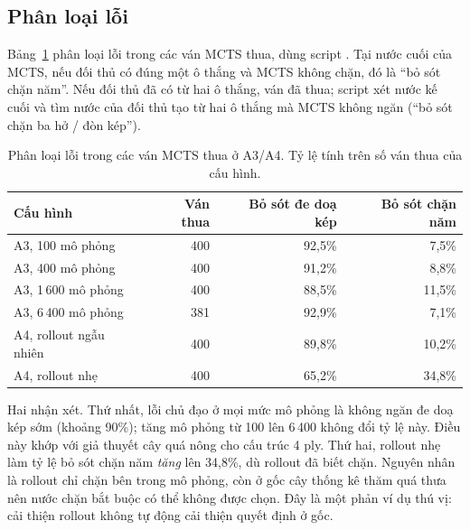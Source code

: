 \subsection{Phân loại lỗi}
Bảng~\ref{tab:tn-loi-mcts} phân loại lỗi trong các ván MCTS thua, dùng script
. Tại nước cuối của MCTS, nếu đối thủ có đúng
một ô thắng và MCTS không chặn, đó là ``bỏ sót chặn năm''. Nếu đối thủ đã có từ hai ô thắng,
ván đã thua; script xét nước kế cuối và tìm nước của đối thủ tạo từ hai ô thắng mà MCTS không
ngăn (``bỏ sót chặn ba hở / đòn kép'').

\begin{table}[H]
  \centering\small
  \caption{Phân loại lỗi trong các ván MCTS thua ở A3/A4. Tỷ lệ tính trên số ván thua của cấu
  hình.}
  \label{tab:tn-loi-mcts}
  \begin{tabular}{@{}lrrr@{}}
    \toprule
    \textbf{Cấu hình} & \textbf{Ván thua} & \textbf{Bỏ sót đe doạ kép} & \textbf{Bỏ sót chặn năm} \\
    \midrule
    A3, 100 mô phỏng & 400 & 92,5\% & 7,5\% \\
    A3, 400 mô phỏng & 400 & 91,2\% & 8,8\% \\
    A3, 1\,600 mô phỏng & 400 & 88,5\% & 11,5\% \\
    A3, 6\,400 mô phỏng & 381 & 92,9\% & 7,1\% \\
    A4, rollout ngẫu nhiên & 400 & 89,8\% & 10,2\% \\
    A4, rollout nhẹ & 400 & 65,2\% & 34,8\% \\
    \bottomrule
  \end{tabular}
\end{table}

Hai nhận xét. Thứ nhất, lỗi chủ đạo ở mọi mức mô phỏng là không ngăn đe doạ kép sớm (khoảng
90\%); tăng mô phỏng từ 100 lên 6\,400 không đổi tỷ lệ này. Điều này khớp với giả thuyết cây
quá nông cho cấu trúc 4 ply. Thứ hai, rollout nhẹ làm tỷ lệ bỏ sót chặn năm \emph{tăng} lên
34,8\%, dù rollout đã biết chặn. Nguyên nhân là rollout chỉ chặn bên trong mô phỏng, còn ở gốc
cây thống kê thăm quá thưa nên nước chặn bắt buộc có thể không được chọn. Đây là một phản ví
dụ thú vị: cải thiện rollout không tự động cải thiện quyết định ở gốc.


